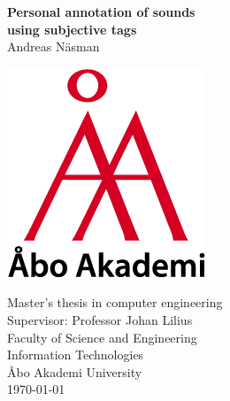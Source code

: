 \begin{titlepage}
    \vspace*{1cm}

    \begin{center}
        \Huge\textbf{Personal annotation of sounds\\using subjective tags}\\
        \vspace{1.5cm}
        \LARGE{Andreas Näsman}
    \end{center}

    \vfill

    \begin{minipage}{0.26\textwidth}
        \includegraphics[width=\linewidth]{figures/abo-akademi-logo}
    \end{minipage}
    \hfill
    \begin{minipage}{0.6\textwidth}\raggedleft{}
        \large
        Master’s thesis in computer engineering\\
        Supervisor: Professor Johan Lilius\\
        Faculty of Science and Engineering\\
        Information Technologies\\
        Åbo Akademi University\\
        \today
    \end{minipage}
\end{titlepage}